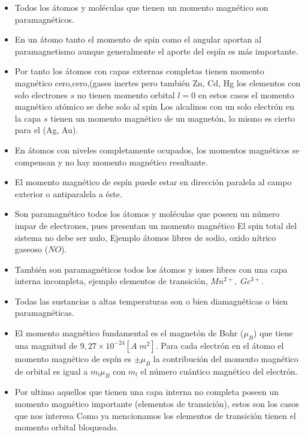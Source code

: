 \begin{itemize}

\item Todos los átomos y moléculas que tienen un momento magnético son paramagnéticos.

\item En un átomo tanto el momento de spin como el angular aportan al paramagnetismo aunque generalmente el aporte del espín es más importante.

\item Por tanto los átomos con capas externas completas tienen momento magnético cero,cero,(gases inertes pero también Zn, Cd, Hg los elementos con solo electrones $s$ no tienen momento orbital $l=0$ en estos casos el momento magnético atómico se debe solo al spin Los alcalinos con un solo electrón en la capa $s$ tienen un momento magnético de un magnetón, lo mismo es cierto para el (Ag, Au).

\item En átomos con niveles completamente ocupados, los momentos magnéticos se compensan y no hay momento magnético resultante.

\item  El momento magnético de espín puede estar en dirección paralela al campo exterior o antiparalela a éste.

\item Son paramagnético todos los átomos y moléculas que poseen un número impar de electrones, pues presentan un momento magnético El spin total del sistema no debe ser nulo, Ejemplo átomos libres de sodio, oxido nítrico gaseoso ($NO$).

\item También son paramagnéticos todos los átomos y iones libres con una capa interna incompleta, ejemplo elementos de transición, $Mn^{2+}, \; Gc^{3+}$.

\item Todas las sustancias a altas temperaturas son o bien diamagnéticas o bien paramagnéticas.

\item El momento magnético fundamental es el magnetón de Bohr ($\mu_{B}$) que tiene una magnitud de $9,27\times 10^{-24}\left[A\; m^{2} \right]$. Para cada electrón en el átomo el momento magnético de espín es $\pm\mu_{B}$ la contribución del momento magnético de orbital es igual a $m_{l}\mu_{B}$ con $m_{l}$ el número cuántico magnético del electrón.


\item Por ultimo aquellos que tienen una capa interna no completa poseen un momento magnético importante (elementos de transición), estos son los casos que nos interesa Como ya mencionamos los elementos de transición tienen el momento orbital bloqueado.

\end{itemize}


